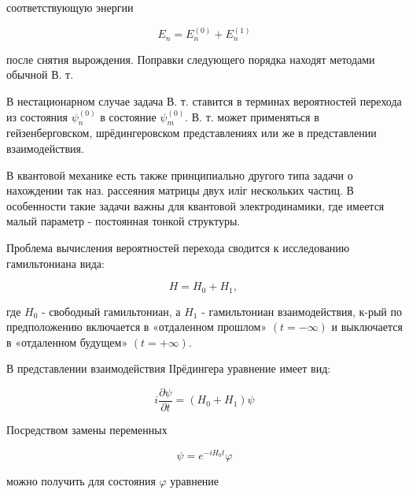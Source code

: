 \documentclass[10pt]{article}
\begin{document}
соответствующую энергии



\[

E_{n}=E_{n}^{(0)}+E_{n}^{(1)}

\]



после снятия вырождения. Поправки следующего порядка находят методами обычной В. т.



В нестационарном случае задача В. т. ставится в терминах вероятностей перехода из состояния $\psi_{n}^{(0)}$ в состояние $\psi_{m}^{(0)}$. В. т. может применяться в гейзенберговском, шрёдингеровском представлениях или же в представлении взаимодействия.



В квантовой механике есть также принципиально другого типа задачи о нахождении так наз. рассеяния матрицы двух иліг нескольких частиц. В особенности такие задачи важны для квантовой электродинамики, где имеется малый параметр - постоянная тонкой структуры.



Проблема вычисления вероятностей перехода сводится к исследованию гамильтониана вида:



\[

H=H_{0}+H_{1} \text {, }

\]



где $H_{0}$ - свободный гамильтониан, а $H_{1}$ - гамильтониан взаимодействия, к-рый по предположению включается в «отдаленном прошлом» $(t=-\infty)$ и выключается в «отдаленном будущем» $(t=+\infty)$.



В представлении взаимодействия ІІрёдингера уравнение имеет вид:



\[

i \frac{\partial \psi}{\partial t}=\left(H_{0}+H_{1}\right) \psi

\]



Посредством замены переменных



\[

\psi=e^{-i H_{0} t} \varphi

\]



можно получить для состояния $\varphi$ уравнение
\end{document}
